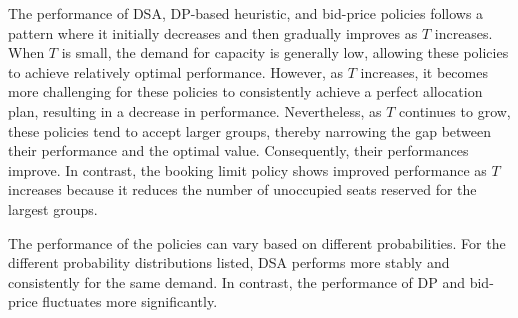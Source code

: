 The performance of DSA, DP-based heuristic, and bid-price policies follows a pattern where it initially decreases and then gradually improves as $T$ increases. When $T$ is small, the demand for capacity is generally low, allowing these policies to achieve relatively optimal performance. However, as $T$ increases, it becomes more challenging for these policies to consistently achieve a perfect allocation plan, resulting in a decrease in performance. Nevertheless, as $T$ continues to grow, these policies tend to accept larger groups, thereby narrowing the gap between their performance and the optimal value. Consequently, their performances improve. In contrast, the booking limit policy shows improved performance as $T$ increases because it reduces the number of unoccupied seats reserved for the largest groups. 

The performance of the policies can vary based on different probabilities. For the different probability distributions listed, DSA performs more stably and consistently for the same demand. In contrast, the performance of DP and bid-price fluctuates more significantly.





